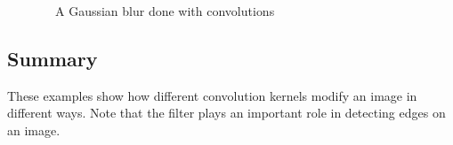 \begin{figure}[H]
	\centering
	\caption{~~A Gaussian blur done with convolutions}
	\label{lena:Gaussian}
\end{figure}

\fi

\subsection{Summary}
These examples show  how different convolution kernels modify an image in different ways. Note that the filter plays an important role in detecting edges on an image.
